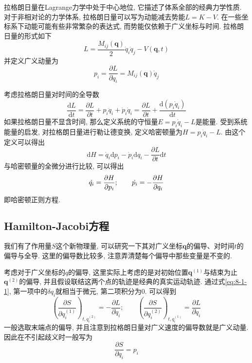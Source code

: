         拉格朗日量在Lagrange力学中处于中心地位, 它描述了体系全部的经典力学性质. 对于非相对论的力学体系, 拉格朗日量可以写为动能减去势能$L = K - V$. 在一些坐标系下动能可能有些非常繁杂的表达式, 而势能仅依赖于广义坐标与时间. 拉格朗日量的形式如下
        \begin{equation}
            L =  \frac{M_{ij}(\bm q)}{2} \dot q_i \dot q_j  - V(\bm q, t)
        \end{equation}
        并定义广义动量为
        \begin{equation}
            p_i =\frac{\partial L}{\partial \dot q_i} = M_{ij}(\bm q) \dot q_j
        \end{equation}

        \splitline

        考虑拉格朗日量对时间的全导数
        \begin{equation}
            \frac{\mathrm{d} L}{\mathrm{d} t} = \frac{\partial L}{\partial t} + p_i \ddot q_i + \dot p_i \dot q_i = \frac{\partial L}{\partial t} +  \frac{\mathrm{d} (p_i \dot q_i)}{\mathrm{d} t}
        \end{equation}
        如果拉格朗日量不显含时间, 那么定义系统的守恒量$E = p_i \dot q_i - L$是能量. 
        受到系统能量的启发, 对拉格朗日量进行勒让德变换, 定义哈密顿量为$H = p_i \dot q_i - L$. 
        由这个定义可以得出
        \begin{equation}
            \mathrm{d} H = \dot q_i \mathrm{d} p_i - \dot p_i \mathrm{d} q_i - \frac{\partial L}{\partial t} \mathrm{d} t
        \end{equation}
        与哈密顿量的全微分进行比较, 可以得出
        \begin{equation}
            \dot{q_{i}} = \frac{\partial{H}}{\partial{p_i}};
            \qquad
            \dot{p_{i}} = -\frac{\partial{H}}{\partial{q_i}}
        \end{equation}
        即哈密顿正则方程.

        \subsection{Hamilton-Jacobi方程}

        我们有了作用量$S$这个新物理量, 可以研究一下其对广义坐标$\bm q$的偏导、对时间$t$的偏导与全导. 这里的偏导数比较多, 注意弄清楚每个偏导中那些变量是不变的. 

        考虑对于广义坐标的$q$的偏导, 这里实际上考虑的是对初始位置$\bm q^{(1)}$与结束为止$\bm q^{(2)}$的偏导, 并且假设联结这两个点的轨迹是经典的真实运动轨迹. 通过式\ref{eq:8-1-1}, 第一项中的$\delta q_i$就相当于微元, 第二项积分为0. 可以得到
        \begin{equation}
            \left( \frac{\partial S}{\partial q_i^{(1)}} \right)_{t, q_i^{(2)}} = - \frac{\partial L}{\partial \dot q_i};
            \qquad
            \left(\frac{\partial S}{\partial q_i^{(2)}}\right)_{t, q_i^{(1)}} = \frac{\partial L}{\partial \dot q_i}
        \end{equation}
        一般选取末端点的偏导, 并且注意到拉格朗日量对广义速度的偏导数就是广义动量. 因此在不引起歧义时一般写为
        \begin{equation}
            \frac{\partial S}{\partial q_i} = p_i
        \end{equation}

